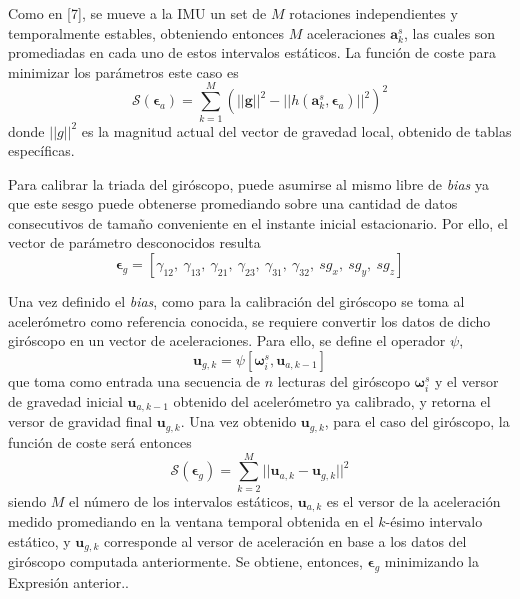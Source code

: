 Como en [7], se mueve a la IMU un set de $M$ rotaciones independientes y temporalmente estables, obteniendo entonces $M$ aceleraciones $\bm{a}^s_k$, las cuales son promediadas en cada uno de estos intervalos estáticos. La función de coste para minimizar los parámetros este caso es
\begin{equation}
    \mathscr{S}(\bm{\epsilon}_{a}) = \sum_{k=1}^M(||\bm{g}||^2-||h(\bm{a}^s_k,\bm{\epsilon}_{a})||^2)^2
    \label{eq:generalaccelcostfunction}
\end{equation}
donde $||g||^2$ es la magnitud actual del vector de gravedad local, obtenido de tablas específicas.

Para calibrar la triada del giróscopo, puede asumirse al mismo libre de \textit{bias} ya que este sesgo puede obtenerse promediando sobre una cantidad de datos consecutivos de tamaño conveniente en el instante inicial estacionario. Por ello, el vector de parámetro desconocidos resulta
\begin{equation}
    \bm{\epsilon}_{g} = \left[\gamma_{12},\ \gamma_{13},\ \gamma_{21},\ \gamma_{23},\ \gamma_{31},\ \gamma_{32},\ sg_x,\ sg_y,\ sg_z\right]
    \label{eq:gyrocalibrationparams}
\end{equation}

Una vez definido el \textit{bias}, como para la calibración del giróscopo se toma al acelerómetro como referencia conocida, se requiere convertir los datos de dicho giróscopo en un vector de aceleraciones. Para ello, se define el operador $\psi$, 
\begin{equation}
    \bm{u}_{g,k} = \psi\left[\bm{\omega}_i^s,\bm{u}_{a,k-1}\right]
\end{equation}
que toma como entrada una secuencia de $n$ lecturas del giróscopo $\bm{\omega}_i^s$ y el versor de gravedad inicial $\bm{u}_{a,k-1}$ obtenido del acelerómetro ya calibrado, y retorna el versor de gravidad final $\bm{u}_{g,k}$. 
Una vez obtenido $\bm{u}_{g,k}$, para el caso del giróscopo, la función de coste será entonces
\begin{equation}
    \mathscr{S}(\bm{\epsilon}_{g}) = \sum_{k=2}^M ||\bm{u}_{a,k} - \bm{u}_{g,k}||^2
\end{equation}
siendo $M$ el número de los intervalos estáticos, $\bm{u}_{a,k}$ es el versor de la aceleración medido promediando en la ventana temporal obtenida en el $k$-ésimo intervalo estático, y $\bm{u}_{g,k}$ corresponde al versor de aceleración en base a los datos del giróscopo computada anteriormente. Se obtiene, entonces, $\bm{\epsilon}_{g}$ minimizando la Expresión anterior..

